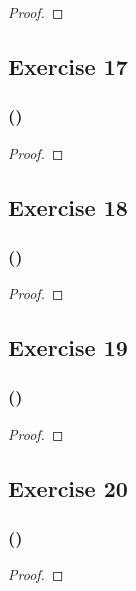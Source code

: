\documentclass[14pt]{extarticle}
\begin{document}
\begin{proof}

\end{proof}

\subsection{Exercise 17}

\subsubsection{()}

\begin{proof}

\end{proof}

\subsection{Exercise 18}

\subsubsection{()}

\begin{proof}

\end{proof}

\subsection{Exercise 19}

\subsubsection{()}

\begin{proof}

\end{proof}

\subsection{Exercise 20}

\subsubsection{()}

\begin{proof}

\end{proof}
\end{document}
